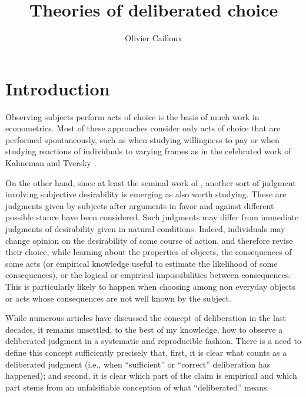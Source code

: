 \documentclass[version=last, pagesize, twoside=off, bibliography=totoc, DIV=calc, fontsize=12pt, a4paper, french, english]{scrartcl}
\begin{document}
\title{Theories of deliberated choice}
\author{Olivier Cailloux}
\makeatletter
{}
\makeatother
\maketitle

\section{Introduction}
Observing subjects perform acts of choice is the basis of much work in econometrics.
Most of these approaches consider only acts of choice that are performed spontaneously, such as when studying willingness to pay or when studying reactions of individuals to varying frames as in the celebrated work of Kahneman and Tversky \citep{bell_descriptive_1988, kahneman_thinking_2012}.

On the other hand, since at least the seminal work of \citet{fishkin_when_2011}, another sort of judgment involving subjective desirability is emerging as also worth studying. These are judgments given by subjects after arguments in favor and against different possible stance have been considered. Such judgments may differ from immediate judgments of desirability given in natural conditions. Indeed, individuals may change opinion on the desirability of some course of action, and therefore revise their choice, while learning about the properties of objects, the consequences of some acts (or empirical knowledge useful to estimate the likelihood of some consequences), or the logical or empirical impossibilities between consequences. This is particularly likely to happen when choosing among non everyday objects or acts whose consequences are not well known by the subject.

While numerous articles have discussed the concept of deliberation in the last decades, it remains unsettled, to the best of my knowledge, how to observe a deliberated judgment in a systematic and reproducible fashion. There is a need to define this concept sufficiently precisely that, first, it is clear what counts as a deliberated judgment (i.e., when “sufficient” \citep{meinard_justification_2020} or “correct” deliberation has happened); and second, it is clear which part of the claim is empirical and which part stems from an unfalsifiable conception of what “deliberated” means. 
\end{document}
